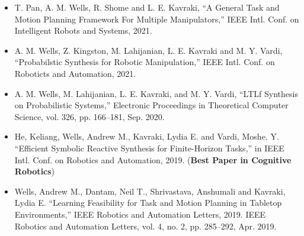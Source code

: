 \begin{itemize}
\vspace{8pt} 

\item[]{T. Pan, A. M. Wells, R. Shome and L. E. Kavraki, ``A General Task and Motion Planning Framework For Multiple Manipulators,'' IEEE Intl. Conf. on Intelligent Robots and Systems, 2021.}

\vspace{8pt} 

\item[] {A. M. Wells, Z. Kingston, M. Lahijanian, L. E. Kavraki and M. Y. Vardi, ``Probabilstic Synthesis for Robotic Manipulation,'' IEEE Intl. Conf. on Roboticts and Automation, 2021.}

\vspace{8pt} 

\item[]{A. M. Wells, M. Lahijanian, L. E. Kavraki, and M. Y. Vardi, “LTLf Synthesis on Probabilistic Systems,” Electronic Proceedings in Theoretical Computer Science, vol. 326, pp. 166–181, Sep. 2020.}





\vspace{8pt} 

\item[]{He, Keliang, Wells, Andrew M., Kavraki, Lydia E. and Vardi, Moshe. Y.  “Efficient Symbolic Reactive Synthesis for Finite-Horizon Tasks,” in IEEE Intl. Conf. on Robotics and Automation, 2019. (\textbf{Best Paper in Cognitive Robotics})}

\vspace{8pt} 

\item[]{Wells, Andrew M., Dantam, Neil T., Shrivastava, Anshumali and Kavraki, Lydia E.  “Learning Feasibility for Task and Motion Planning in Tabletop Environments,” IEEE Robotics and Automation Letters, 2019. IEEE Robotics and Automation Letters, vol. 4, no. 2, pp. 285–292, Apr. 2019.}


\end{itemize}
